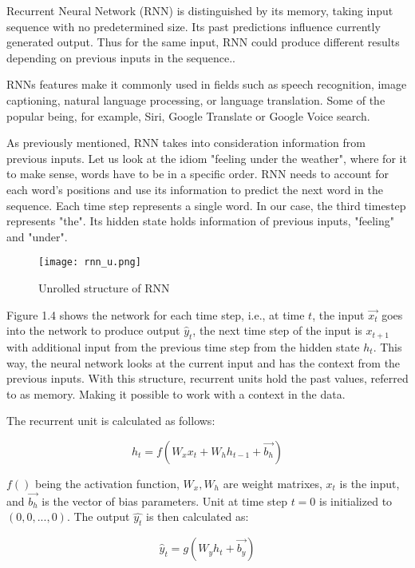 Recurrent Neural Network (RNN) is distinguished by its memory, taking input sequence with no predetermined size. Its past predictions influence currently generated output. Thus for the same input, RNN could produce different results depending on previous inputs in the sequence.\cite{rnnDSmedium}.

RNNs features make it commonly used in fields such as speech recognition, image captioning, natural language processing, or language translation. Some of the popular being, for example, Siri, Google Translate or Google Voice search.\cite{ibmrnn}

As previously mentioned, RNN takes into consideration information from previous inputs. Let us look at the idiom "feeling under the weather", where for it to make sense, words have to be in a specific order. RNN needs to account for each word's positions and use its information to predict the next word in the sequence. Each time step represents a single word. In our case, the third timestep represents "the". Its hidden state holds information of previous inputs, "feeling" and "under".\cite{ibmrnn}

\begin{figure}[h]
	\centering
    \texttt{[image: rnn\_u.png]}
	\caption{Unrolled structure of RNN \cite{matous}}
	\label{fig:rnn}
\end{figure}


Figure 1.4 shows the network for each time step, i.e., at time $t$, the input $\vec{x_t}$ goes into the network to produce output $\hat{y}_t$, the next time step of the input is $x_{t+1}$ with additional input from the previous time step from the hidden state $h_{t}$. This way, the neural network looks at the current input and has the context from the previous inputs.
With this structure, recurrent units hold the past values, referred to as memory. Making it possible to work with a context in the data.
\cite{rnnin6}

The recurrent unit is calculated as follows:

\begin{equation}
    {h_t = f(W_{x}x_t + W_{h}h_{t-1}+\vec{b_h})}
\end{equation}

$f()$ being the activation function, $W_x,W_h$ are weight matrixes, $x_t$ is the input, and $\vec{b_h}$ is the vector of bias parameters. Unit at time step $t=0$ is initialized to $(0,0,...,0)$. The output $\hat{y_t}$ is then calculated as:

\begin{equation}
    {\hat{y}_t = g(W_{y}h_t + \vec{b_y})}
\end{equation}

